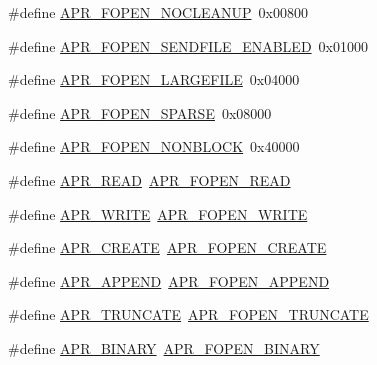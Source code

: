 \begin{DoxyCompactItemize}
\item 
\#define \hyperlink{group__apr__file__open__flags_ga3fc9b5a7791d9f462997cd29de67eb80}{A\+P\+R\+\_\+\+F\+O\+P\+E\+N\+\_\+\+N\+O\+C\+L\+E\+A\+N\+UP}~0x00800
\item 
\#define \hyperlink{group__apr__file__open__flags_ga60c21e28e4a612d58a874fe2cc71a6e4}{A\+P\+R\+\_\+\+F\+O\+P\+E\+N\+\_\+\+S\+E\+N\+D\+F\+I\+L\+E\+\_\+\+E\+N\+A\+B\+L\+ED}~0x01000
\item 
\#define \hyperlink{group__apr__file__open__flags_gaf6cfaa4789e6264afd186235f0adbc22}{A\+P\+R\+\_\+\+F\+O\+P\+E\+N\+\_\+\+L\+A\+R\+G\+E\+F\+I\+LE}~0x04000
\item 
\#define \hyperlink{group__apr__file__open__flags_ga0d155e9bb7fbf1a5cd4e84b5ede059f4}{A\+P\+R\+\_\+\+F\+O\+P\+E\+N\+\_\+\+S\+P\+A\+R\+SE}~0x08000
\item 
\#define \hyperlink{group__apr__file__open__flags_ga31e4d14068147e43e1778bcf975dda62}{A\+P\+R\+\_\+\+F\+O\+P\+E\+N\+\_\+\+N\+O\+N\+B\+L\+O\+CK}~0x40000
\item 
\#define \hyperlink{group__apr__file__open__flags_ga0021db78d799d1c8825b701c7efee483}{A\+P\+R\+\_\+\+R\+E\+AD}~\hyperlink{group__apr__file__open__flags_gaf9e7303f028b130ff7d4b209d6662d7d}{A\+P\+R\+\_\+\+F\+O\+P\+E\+N\+\_\+\+R\+E\+AD}
\item 
\#define \hyperlink{group__apr__file__open__flags_ga3e427e53aceb1ccdb078d9a03cd63d01}{A\+P\+R\+\_\+\+W\+R\+I\+TE}~\hyperlink{group__apr__file__open__flags_gac598bb95fc9476b0bf2ed0b1c308842c}{A\+P\+R\+\_\+\+F\+O\+P\+E\+N\+\_\+\+W\+R\+I\+TE}
\item 
\#define \hyperlink{group__apr__file__open__flags_gac210e96bc821dbaa83c326e775dad028}{A\+P\+R\+\_\+\+C\+R\+E\+A\+TE}~\hyperlink{group__apr__file__open__flags_gafe94f21ccbf411172e70e7f473af251a}{A\+P\+R\+\_\+\+F\+O\+P\+E\+N\+\_\+\+C\+R\+E\+A\+TE}
\item 
\#define \hyperlink{group__apr__file__open__flags_ga26d3de2bae5c90e5124869f56c141c2e}{A\+P\+R\+\_\+\+A\+P\+P\+E\+ND}~\hyperlink{group__apr__file__open__flags_ga45f353db9b71d4760a3f35cf3781cfc8}{A\+P\+R\+\_\+\+F\+O\+P\+E\+N\+\_\+\+A\+P\+P\+E\+ND}
\item 
\#define \hyperlink{group__apr__file__open__flags_gaa8898fdebd69d3a64286731b713a6dc9}{A\+P\+R\+\_\+\+T\+R\+U\+N\+C\+A\+TE}~\hyperlink{group__apr__file__open__flags_ga09b05a5bd5db534b93794f7657bcb146}{A\+P\+R\+\_\+\+F\+O\+P\+E\+N\+\_\+\+T\+R\+U\+N\+C\+A\+TE}
\item 
\#define \hyperlink{group__apr__file__open__flags_ga0e7556bac0cc0d1dafdf38952a4e4015}{A\+P\+R\+\_\+\+B\+I\+N\+A\+RY}~\hyperlink{group__apr__file__open__flags_gacb20b3028864f34cb26314fe2cacc3fa}{A\+P\+R\+\_\+\+F\+O\+P\+E\+N\+\_\+\+B\+I\+N\+A\+RY}

\end{DoxyCompactItemize}
